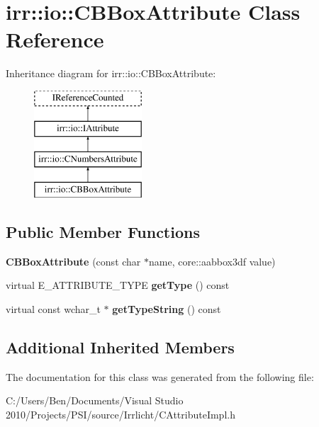 \hypertarget{classirr_1_1io_1_1_c_b_box_attribute}{\section{irr\-:\-:io\-:\-:C\-B\-Box\-Attribute Class Reference}
\label{classirr_1_1io_1_1_c_b_box_attribute}
}
Inheritance diagram for irr\-:\-:io\-:\-:C\-B\-Box\-Attribute\-:\begin{figure}[H]
\begin{center}
\leavevmode
\includegraphics[height=4.000000cm]{classirr_1_1io_1_1_c_b_box_attribute}
\end{center}
\end{figure}
\subsection*{Public Member Functions}
\begin{DoxyCompactItemize}
\item 
\hypertarget{classirr_1_1io_1_1_c_b_box_attribute_ae80a31083d22e830b1b5a12bb3046b2a}{{\bfseries C\-B\-Box\-Attribute} (const char $\ast$name, core\-::aabbox3df value)}\label{classirr_1_1io_1_1_c_b_box_attribute_ae80a31083d22e830b1b5a12bb3046b2a}

\item 
\hypertarget{classirr_1_1io_1_1_c_b_box_attribute_a3e811b6dea62b935f7b678e4f49d3687}{virtual E\-\_\-\-A\-T\-T\-R\-I\-B\-U\-T\-E\-\_\-\-T\-Y\-P\-E {\bfseries get\-Type} () const }\label{classirr_1_1io_1_1_c_b_box_attribute_a3e811b6dea62b935f7b678e4f49d3687}

\item 
\hypertarget{classirr_1_1io_1_1_c_b_box_attribute_a873484a201a8606f5f91b0ce40d14448}{virtual const wchar\-\_\-t $\ast$ {\bfseries get\-Type\-String} () const }\label{classirr_1_1io_1_1_c_b_box_attribute_a873484a201a8606f5f91b0ce40d14448}

\end{DoxyCompactItemize}
\subsection*{Additional Inherited Members}


The documentation for this class was generated from the following file\-:\begin{DoxyCompactItemize}
\item 
C\-:/\-Users/\-Ben/\-Documents/\-Visual Studio 2010/\-Projects/\-P\-S\-I/source/\-Irrlicht/C\-Attribute\-Impl.\-h\end{DoxyCompactItemize}
